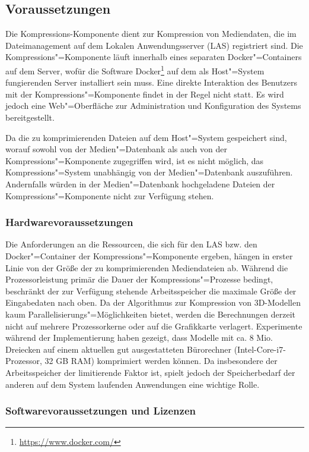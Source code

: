 \subsection{Voraussetzungen}

Die Kompressions-Komponente dient zur Kompression von Mediendaten, die im Dateimanagement auf dem Lokalen Anwendungsserver (LAS) registriert sind. Die Kompressions"=Komponente läuft innerhalb eines separaten Docker"=Containers auf dem Server, wofür die Software Docker\footnote{\url{https://www.docker.com/}} auf dem als Host"=System fungierenden Server installiert sein muss. Eine direkte Interaktion des Benutzers mit der Kompressions"=Komponente findet in der Regel nicht statt. Es wird jedoch eine Web"=Oberfläche zur Administration und Konfiguration des Systems bereitgestellt. 

Da die zu komprimierenden Dateien auf dem Host"=System gespeichert sind, worauf sowohl von der Medien"=Datenbank als auch von der Kompressions"=Komponente zugegriffen wird, ist es nicht möglich, das Kompressions"=System unabhängig von der Medien"=Datenbank auszuführen. Andernfalls würden in der Medien"=Datenbank hochgeladene Dateien der Kompressions"=Komponente nicht zur Verfügung stehen. 

\subsubsection{Hardwarevoraussetzungen}
\label{schlenke:chp:info:hardware}

Die Anforderungen an die Ressourcen, die sich für den LAS bzw. den Docker"=Container der Kompressions"=Komponente ergeben, hängen in erster Linie von der Größe der zu komprimierenden Mediendateien ab. Während die Prozessorleistung primär die Dauer der Kompressions"=Prozesse bedingt, beschränkt der zur Verfügung stehende Arbeitsspeicher die maximale Größe der Eingabedaten nach oben.
Da der Algorithmus zur Kompression von 3D-Modellen kaum Parallelisierungs"=Möglichkeiten bietet, werden die Berechnungen derzeit nicht auf mehrere Prozessorkerne oder auf die Grafikkarte verlagert. 
Experimente während der Implementierung haben gezeigt, dass Modelle mit ca. 8 Mio. Dreiecken auf einem aktuellen gut ausgestatteten Bürorechner (Intel-Core-i7-Prozessor, 32 GB RAM) komprimiert werden können. Da insbesondere der Arbeitsspeicher der limitierende Faktor ist, spielt jedoch der Speicherbedarf der anderen auf dem System laufenden Anwendungen eine wichtige Rolle.

\subsubsection{Softwarevoraussetzungen und Lizenzen}

